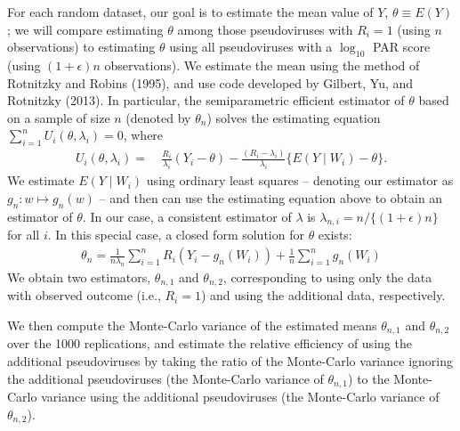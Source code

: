 \documentclass[10pt]{article}
\begin{document}
For each random dataset, our goal is to estimate the mean value of $Y$, $\theta \equiv E(Y)$; we will compare estimating $\theta$ among those pseudoviruses with $R_i = 1$ (using $n$ observations) to estimating $\theta$ using all pseudoviruses with a $\log_{10}$ PAR score (using $(1+\epsilon)n$ observations). We estimate the mean using the method of Rotnitzky and Robins (1995), and use code developed by Gilbert, Yu, and Rotnitzky (2013). In particular, the semiparametric efficient estimator of $\theta$ based on a sample of size $n$ (denoted by $\theta_n$) solves the estimating equation $\sum_{i=1}^n U_i(\theta, \lambda_i) = 0$, where
\begin{align*}
    U_i(\theta, \lambda_i) =& \ \frac{R_i}{\lambda_i}(Y_i - \theta) - \frac{(R_i - \lambda_i)}{\lambda_i}\{E(Y \mid W_i) - \theta\}.
\end{align*}
We estimate $E(Y \mid W_i)$ using ordinary least squares -- denoting our estimator as $g_n: w \mapsto g_n(w)$ -- and then can use the estimating equation above to obtain an estimator of $\theta$. In our case, a consistent estimator of $\lambda$ is $\lambda_{n,i} = n / \{(1 + \epsilon)n\}$ for all $i$. In this special case, a closed form solution for $\theta$ exists:
\begin{align*}
    \theta_n = \frac{1}{n\lambda_n}\sum_{i=1}^nR_i(Y_i - g_n(W_i)) + \frac{1}{n}\sum_{i=1}^n g_n(W_i)
\end{align*}
 We obtain two estimators, $\theta_{n,1}$ and $\theta_{n,2}$, corresponding to using only the data with observed outcome (i.e., $R_i = 1$) and using the additional data, respectively.

We then compute the Monte-Carlo variance of the estimated means $\theta_{n,1}$ and $\theta_{n,2}$ over the 1000 replications, and estimate the relative efficiency of using the additional pseudoviruses by taking the ratio of the Monte-Carlo variance ignoring the additional pseudoviruses (the Monte-Carlo variance of $\theta_{n,1}$) to the Monte-Carlo variance using the additional pseudoviruses (the Monte-Carlo variance of $\theta_{n,2}$).
\end{document}

